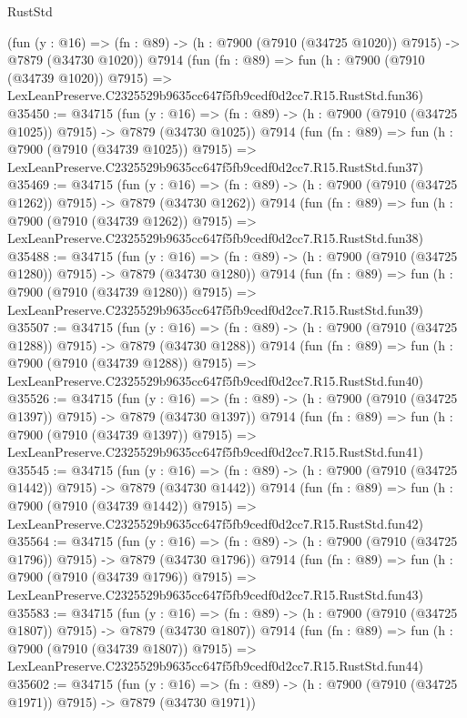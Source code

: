 \begin{lexlean}{RustStd}
\begin{coremodule}
    (fun (y : @16) =>
    (fn : @89) -> (h : @7900 (@7910 (@34725 @1020)) @7915) -> @7879 (@34730 @1020))
    @7914
    (fun (fn : @89) =>
    fun (h : @7900 (@7910 (@34739 @1020)) @7915) =>
    LexLeanPreserve.C2325529b9635cc647f5fb9cedf0d2cc7.R15.RustStd.fun36)
@35450 := @34715
    (fun (y : @16) =>
    (fn : @89) -> (h : @7900 (@7910 (@34725 @1025)) @7915) -> @7879 (@34730 @1025))
    @7914
    (fun (fn : @89) =>
    fun (h : @7900 (@7910 (@34739 @1025)) @7915) =>
    LexLeanPreserve.C2325529b9635cc647f5fb9cedf0d2cc7.R15.RustStd.fun37)
@35469 := @34715
    (fun (y : @16) =>
    (fn : @89) -> (h : @7900 (@7910 (@34725 @1262)) @7915) -> @7879 (@34730 @1262))
    @7914
    (fun (fn : @89) =>
    fun (h : @7900 (@7910 (@34739 @1262)) @7915) =>
    LexLeanPreserve.C2325529b9635cc647f5fb9cedf0d2cc7.R15.RustStd.fun38)
@35488 := @34715
    (fun (y : @16) =>
    (fn : @89) -> (h : @7900 (@7910 (@34725 @1280)) @7915) -> @7879 (@34730 @1280))
    @7914
    (fun (fn : @89) =>
    fun (h : @7900 (@7910 (@34739 @1280)) @7915) =>
    LexLeanPreserve.C2325529b9635cc647f5fb9cedf0d2cc7.R15.RustStd.fun39)
@35507 := @34715
    (fun (y : @16) =>
    (fn : @89) -> (h : @7900 (@7910 (@34725 @1288)) @7915) -> @7879 (@34730 @1288))
    @7914
    (fun (fn : @89) =>
    fun (h : @7900 (@7910 (@34739 @1288)) @7915) =>
    LexLeanPreserve.C2325529b9635cc647f5fb9cedf0d2cc7.R15.RustStd.fun40)
@35526 := @34715
    (fun (y : @16) =>
    (fn : @89) -> (h : @7900 (@7910 (@34725 @1397)) @7915) -> @7879 (@34730 @1397))
    @7914
    (fun (fn : @89) =>
    fun (h : @7900 (@7910 (@34739 @1397)) @7915) =>
    LexLeanPreserve.C2325529b9635cc647f5fb9cedf0d2cc7.R15.RustStd.fun41)
@35545 := @34715
    (fun (y : @16) =>
    (fn : @89) -> (h : @7900 (@7910 (@34725 @1442)) @7915) -> @7879 (@34730 @1442))
    @7914
    (fun (fn : @89) =>
    fun (h : @7900 (@7910 (@34739 @1442)) @7915) =>
    LexLeanPreserve.C2325529b9635cc647f5fb9cedf0d2cc7.R15.RustStd.fun42)
@35564 := @34715
    (fun (y : @16) =>
    (fn : @89) -> (h : @7900 (@7910 (@34725 @1796)) @7915) -> @7879 (@34730 @1796))
    @7914
    (fun (fn : @89) =>
    fun (h : @7900 (@7910 (@34739 @1796)) @7915) =>
    LexLeanPreserve.C2325529b9635cc647f5fb9cedf0d2cc7.R15.RustStd.fun43)
@35583 := @34715
    (fun (y : @16) =>
    (fn : @89) -> (h : @7900 (@7910 (@34725 @1807)) @7915) -> @7879 (@34730 @1807))
    @7914
    (fun (fn : @89) =>
    fun (h : @7900 (@7910 (@34739 @1807)) @7915) =>
    LexLeanPreserve.C2325529b9635cc647f5fb9cedf0d2cc7.R15.RustStd.fun44)
@35602 := @34715
    (fun (y : @16) =>
    (fn : @89) -> (h : @7900 (@7910 (@34725 @1971)) @7915) -> @7879 (@34730 @1971))

\end{coremodule}
\end{lexlean}
